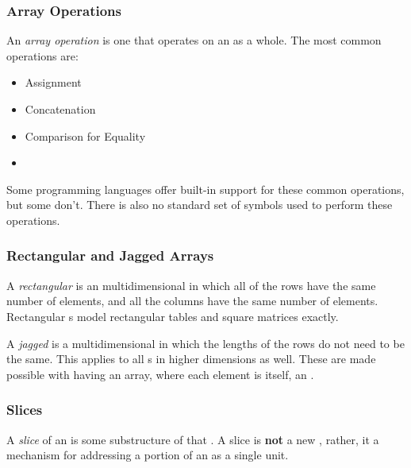 \subsubsection{Array Operations}\label{subsubsec:Arrays-Operations}
\begin{definition}\label{def:Array_Operation}
  An \emph{array operation} is one that operates on an  as a whole.
  The most common operations are:
  \begin{itemize}[noitemsep]
  \item Assignment
  \item Concatenation
  \item Comparison for Equality
  \item {}
  \end{itemize}
\end{definition}

Some programming languages offer built-in support for these common operations, but some don't.
There is also no standard set of symbols used to perform these operations.

\subsubsection{Rectangular and Jagged Arrays}\label{subsubsec:Arrays-Rectangular_Jagged}
\begin{definition}\label{def:Array-Rectangular}
  A \emph{rectangular } is an multidimensional  in which all of the rows have the same number of elements, and all the columns have the same number of elements.
  Rectangular s model rectangular tables and square matrices exactly.
\end{definition}

\begin{definition}\label{def:Array-Jagged}
  A \emph{jagged } is a multidimensional  in which the lengths of the rows do not need to be the same.
  This applies to all s in higher dimensions as well.
  These are made possible with having an array, where each element is itself, an .
\end{definition}

\subsubsection{Slices}\label{subsubsec:Arrays-Slices}
\begin{definition}[Slice]\label{def:Slice}
  A \emph{slice} of an  is some substructure of that .
  A slice is \textbf{not} a new , rather, it a mechanism for addressing a portion of an  as a single unit.
\end{definition}

